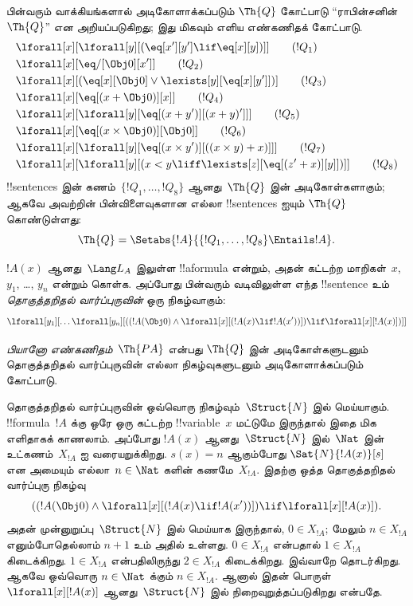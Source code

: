 \documentclass[../../../include/open-logic-section]{subfiles}
\begin{document}
\begin{defn}
பின்வரும் வாக்கியங்களால் அடிகோளாக்கப்படும் $\Th{Q}$ கோட்பாடு
``ராபின்சனின் $\Th{Q}$'' என அறியப்படுகிறது; இது மிகவும் எளிய எண்கணிதக்
கோட்பாடு.
\begin{align*}
& \lforall[x][\lforall[y][(\eq[x'][y'] \lif \eq[x][y])]] \tag{$!Q_1$}\\
& \lforall[x][\eq/[\Obj 0][x']] \tag{$!Q_2$}\\
& \lforall[x][(\eq[x][\Obj 0] \lor \lexists[y][\eq[x][y']])] \tag{$!Q_3$}\\
& \lforall[x][\eq[(x + \Obj 0)][x]] \tag{$!Q_4$}\\
& \lforall[x][\lforall[y][\eq[(x + y')][(x + y)']]] \tag{$!Q_5$}\\
& \lforall[x][\eq[(x \times \Obj 0)][\Obj 0]] \tag{$!Q_6$}\\
& \lforall[x][\lforall[y][\eq[(x \times y')][((x \times y) + x)]]] \tag{$!Q_7$}\\
& \lforall[x][\lforall[y][(x < y \liff \lexists[z][\eq[(z' + x)][y]])]] \tag{$!Q_8$}
\end{align*}
!!{sentence}s இன் கணம்~$\{!Q_1, \dots, !Q_8\}$ ஆனது~$\Th{Q}$ இன்
அடிகோள்களாகும்; ஆகவே அவற்றின் பின்விளைவுகளான எல்லா !!{sentence}s ஐயும்
$\Th{Q}$ கொண்டுள்ளது:
\[
\Th{Q} = \Setabs{!A}{\{!Q_1, \dots, !Q_8\} \Entails !A}.
\]
\end{defn}

\begin{defn}
$!A(x)$ ஆனது~$\Lang L_A$ இலுள்ள !!a{formula} என்றும், அதன் கட்டற்ற
மாறிகள்~$x$, $y_1$, \dots, $y_n$ என்றும் கொள்க. அப்போது பின்வரும்
வடிவிலுள்ள எந்த !!{sentence} உம் \emph{தொகுத்தறிதல் வார்ப்புருவின்}
ஒரு நிகழ்வாகும்:
\[
\lforall[y_1][\dots\lforall[y_n][((!A(\Obj 0) \land \lforall[x][(!A(x)
\lif !A(x'))]) \lif \lforall[x][!A(x)])]]
\]

\emph{பியானோ எண்கணிதம்}~$\Th{PA}$ என்பது $\Th{Q}$ இன் அடிகோள்களுடனும்
தொகுத்தறிதல் வார்ப்புருவின் எல்லா நிகழ்வுகளுடனும் அடிகோளாக்கப்படும் கோட்பாடு.
\end{defn}

\begin{explain}
தொகுத்தறிதல் வார்ப்புருவின் ஒவ்வொரு நிகழ்வும்~$\Struct{N}$ இல் மெய்யாகும்.
!!{formula}~$!A$ க்கு ஒரே ஒரு கட்டற்ற !!{variable}~$x$ மட்டுமே இருந்தால்
இதை மிக எளிதாகக் காணலாம். அப்போது $!A(x)$ ஆனது~$\Struct{N}$ இல்~$\Nat$
இன் உட்கணம்~$X_{!A}$ ஐ வரையறுக்கிறது. $s(x) = n$ ஆகும்போது
$\Sat{N}{!A(x)}[s]$ என அமையும் எல்லா~$n \in \Nat$ களின் கணமே~$X_{!A}$.
இதற்கு ஒத்த தொகுத்தறிதல் வார்ப்புரு நிகழ்வு
\[
((!A(\Obj 0) \land \lforall[x][(!A(x) \lif !A(x'))]) \lif 
  \lforall[x][!A(x)]).
\]
அதன் முன்னுறுப்பு~$\Struct{N}$ இல் மெய்யாக இருந்தால், $0 \in X_{!A}$;
மேலும் $n \in X_{!A}$ எனும்போதெல்லாம் $n+1$ உம் அதில் உள்ளது.
$0 \in X_{!A}$ என்பதால் $1 \in X_{!A}$ கிடைக்கிறது. $1 \in X_{!A}$
என்பதிலிருந்து $2 \in X_{!A}$ கிடைக்கிறது. இவ்வாறே தொடர்கிறது. ஆகவே
ஒவ்வொரு $n \in \Nat$ க்கும் $n \in X_{!A}$. ஆனால் இதன் பொருள்
$\lforall[x][!A(x)]$ ஆனது~$\Struct{N}$ இல் நிறைவுறுத்தப்படுகிறது என்பதே.
\end{explain}
\end{document}
